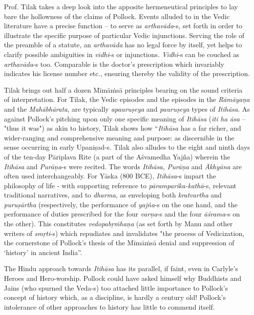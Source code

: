 Prof. Tilak takes a deep look into the apposite hermeneutical principles to lay bare the hollowness of the claims of Pollock. Events alluded to in the Vedic literature have a precise function – to serve as \textit{arthavāda}-s, set forth in order to illustrate the specific purpose of particular Vedic injunctions. Serving the role of the preamble of a statute, an \textit{arthavāda} has no legal force by itself, yet helps to clarify possible ambiguities in \textit{vidhi}-s or injunctions. \textit{Vidhi}-s can be couched as \textit{arthavāda}-s too. Comparable is the doctor’s prescription which invariably indicates his license number etc., ensuring thereby the validity of the prescription. 

Tilak brings out half a dozen Mīmāṁsā principles bearing on the sound criteria of interpretation. For Tilak, the Vedic episodes and the episodes in the \textit{Rāmāyaṇa} and the \textit{Mahābhārata}, are typically \textit{apauruṣeya} and \textit{pauruṣeya} types of \textit{Itihāsa}. As against Pollock’s pitching upon only one specific meaning of \textit{Itihāsa} (\textit{iti ha āsa} – "thus it was") as akin to history, Tilak shows how “\textit{Itihāsa} has a far richer, and wider-ranging and comprehensive meaning and purpose: as discernible in the sense occurring in early Upaniṣad-s. Tilak also alludes to the eight and ninth days of the ten-day Pāriplava Rite (a part of the Aśvamedha Yajña) wherein the \textit{Itihāsa} and \textit{Purāṇa}-s were recited. The words \textit{Itihāsa, Purāṇa} and \textit{Ākhyāna} are often used interchangeably. For Yāska (800 BCE), \textit{Itihāsa}-s impart the philosophy of life - with supporting reference to \textit{pāramparika-kathā}-s, relevant traditional narratives, and to \textit{dharma}, as enveloping both \textit{kratvartha} and \textit{puruṣārtha} (respectively, the performance of \textit{yajña}-s on the one hand, and the performance of duties prescribed for the four \textit{varṇa}-s and the four \textit{āśrama}-s on the other). This constitutes \textit{vedopabṛṁhaṇa} (as set forth by Manu and other writers of \textit{smṛti}-s) which repudiates and invalidates "the process of Vedicization, the cornerstone of Pollock’s thesis of the Mīmāṁsā denial and suppression of ‘history’ in ancient India”. 

The Hindu approach towards \textit{Itihāsa} has its parallel, if faint, even in Carlyle’s Heroes and Hero-worship. Pollock could have asked himself why Buddhists and Jains (who spurned the Veda-s) too attached little importance to Pollock’s concept of history which, as a discipline, is hardly a century old! Pollock’s intolerance of other approaches to history has little to commend itself.

